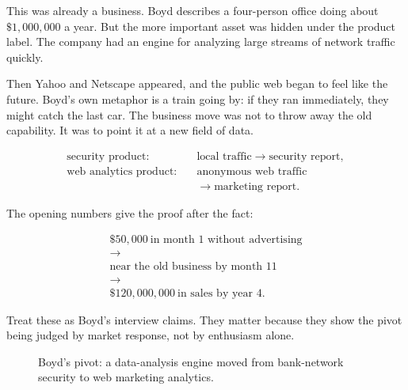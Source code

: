 \documentclass[11pt,oneside]{book}
\begin{document}
This was already a business. Boyd describes a four-person office doing about \(\$1{,}000{,}000\) a year. But the more important asset was hidden under the product label. The company had an engine for analyzing large streams of network traffic quickly.

Then Yahoo and Netscape appeared, and the public web began to feel like the future. Boyd's own metaphor is a train going by: if they ran immediately, they might catch the last car. The business move was not to throw away the old capability. It was to point it at a new field of data.

\begin{align}
\text{security product}:&\quad\text{local traffic}\to\text{security report},\\
\text{web analytics product}:&\quad\text{anonymous web traffic}\\
&\quad\to\text{marketing report}.
\end{align}

The opening numbers give the proof after the fact:

\begin{equation}
\begin{gathered}
\$50{,}000\ \text{in month 1 without advertising}\\
\longrightarrow\\
\text{near the old business by month 11}\\
\longrightarrow\\
\$120{,}000{,}000\ \text{in sales by year 4}.
\end{gathered}
\end{equation}

Treat these as Boyd's interview claims. They matter because they show the pivot being judged by market response, not by enthusiasm alone.

\begin{figure}
\centering
{}
\caption{Boyd's pivot: a data-analysis engine moved from bank-network security to web marketing analytics.}
\end{figure}
\end{document}
